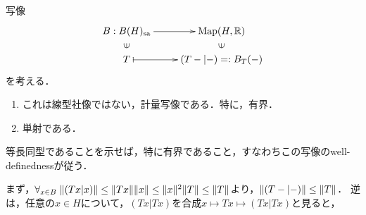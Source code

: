 \documentclass[uplatex,dvipdfmx]{jsreport}
\begin{document}
\begin{lemma}[数域：自己共役作用素に特徴的な対象]\label{lemma-numerical-range}
    写像
    \[\xymatrix@R-2pc{
        B:B(H)_\sa\ar[r]&\Map(H,\R)\\
        \rotatebox[origin=c]{90}{$\in$}&\rotatebox[origin=c]{90}{$\in$}\\
        T\ar@{|->}[r]&(T-|-)=:B_T(-)
    }\]
    を考える．
    \begin{enumerate}
        \item これは線型社像ではない，計量写像である．特に，有界．
        \item 単射である．
    \end{enumerate}
\end{lemma}
\begin{Proof}
    等長同型であることを示せば，特に有界であること，すなわちこの写像のwell-definednessが従う．

    まず，$\forall_{x\in B}\;\|(Tx|x)\|\le\|Tx\|\|x\|\le\|x\|^2\|T\|\le\|T\|$より，$\|(T-|-)\|\le\|T\|$．
    逆は，任意の$x\in H$について，$(Tx|Tx)$を合成$x\mapsto Tx\mapsto (Tx|Tx)$と見ると，
\end{Proof}
\end{document}
